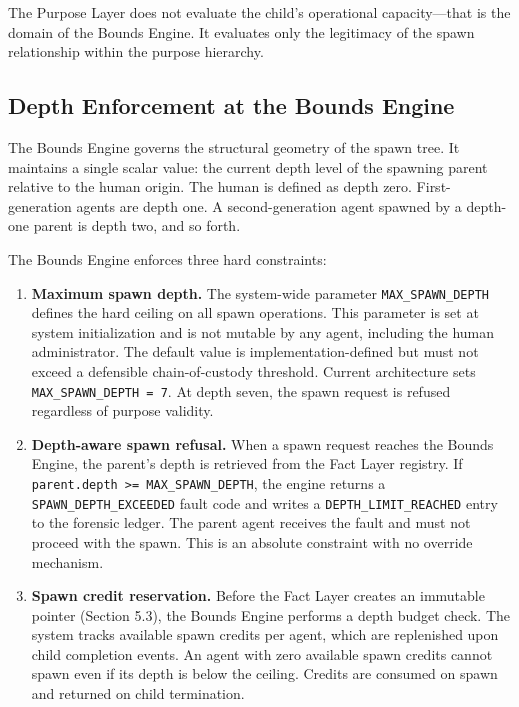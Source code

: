 The Purpose Layer does not evaluate the child's operational capacity—that is the domain of the Bounds Engine. It evaluates only the legitimacy of the spawn relationship within the purpose hierarchy.

\subsection{Depth Enforcement at the Bounds Engine}

The Bounds Engine governs the structural geometry of the spawn tree. It maintains a single scalar value: the current depth level of the spawning parent relative to the human origin. The human is defined as depth zero. First-generation agents are depth one. A second-generation agent spawned by a depth-one parent is depth two, and so forth.

The Bounds Engine enforces three hard constraints:

\begin{enumerate}
    \item \textbf{Maximum spawn depth.} The system-wide parameter \texttt{MAX\_SPAWN\_DEPTH} defines the hard ceiling on all spawn operations. This parameter is set at system initialization and is not mutable by any agent, including the human administrator. The default value is implementation-defined but must not exceed a defensible chain-of-custody threshold. Current architecture sets \texttt{MAX\_SPAWN\_DEPTH = 7}. At depth seven, the spawn request is refused regardless of purpose validity.

    \item \textbf{Depth-aware spawn refusal.} When a spawn request reaches the Bounds Engine, the parent's depth is retrieved from the Fact Layer registry. If \texttt{parent.depth >= MAX\_SPAWN\_DEPTH}, the engine returns a \texttt{SPAWN\_DEPTH\_EXCEEDED} fault code and writes a \texttt{DEPTH\_LIMIT\_REACHED} entry to the forensic ledger. The parent agent receives the fault and must not proceed with the spawn. This is an absolute constraint with no override mechanism.

    \item \textbf{Spawn credit reservation.} Before the Fact Layer creates an immutable pointer (Section 5.3), the Bounds Engine performs a depth budget check. The system tracks available spawn credits per agent, which are replenished upon child completion events. An agent with zero available spawn credits cannot spawn even if its depth is below the ceiling. Credits are consumed on spawn and returned on child termination.
\end{enumerate}

